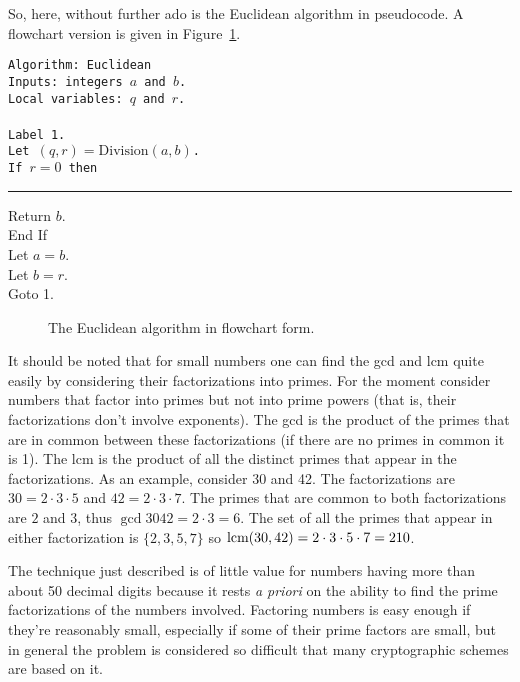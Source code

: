 So, here, without further ado is the Euclidean algorithm in
pseudocode.  A flowchart version is given in Figure~\ref{fig:Euc_alg}.
\medskip

\begin{center}
\begin{minipage}[b]{.7\textwidth}
\tt Algorithm: Euclidean\\
Inputs: integers $a$ and $b$.\\
Local variables: $q$ and $r$.\\
\\
Label 1.\\
Let $(q,r)  = \mbox{Division}(a,b)$. \\
If $r = 0$ then\\
\rule{15pt}{0pt} Return $b$.\\
End If\\
Let $a = b$.\\
Let $b = r$.\\
Goto 1. \\
\end{minipage}
\end{center}

\begin{figure}[!hbt] 
\begin{center}

\end{center}

\caption{The Euclidean algorithm in flowchart form.}
\label{fig:Euc_alg}
\end{figure}

\clearpage 

It should be noted that for small numbers one can find the gcd and lcm
quite easily by considering their factorizations into primes.  For the
moment consider numbers that factor into primes but not into prime
powers (that is, their factorizations don't involve exponents).  The
gcd is the product of the primes that are in common between these
factorizations (if there are no primes in common it is 1).  The lcm is
the product of all the distinct primes 
that appear in the factorizations.  As an example, consider 30 and 42.
The factorizations are $30 = 2\cdot 3\cdot 5$ and $42 = 2\cdot 3 \cdot
7$.  The primes that are common to both factorizations are $2$ and
$3$, thus $\gcd{30}{42} = 2\cdot 3 = 6$.  The set of all the primes 
that appear in either factorization is $\{2, 3, 5, 7 \}$ so
$\mbox{lcm} (30, 42) = 2\cdot 3\cdot 5\cdot 7 = 210$.

The technique just described is of little value for numbers having more
than about 50 decimal digits because it rests {\em a priori} on the
ability to find the prime factorizations of the numbers involved.
Factoring numbers is easy enough if they're reasonably small,
especially if some of their prime factors are small, but in general
the problem is considered so difficult that many cryptographic schemes
are based on it.
 
